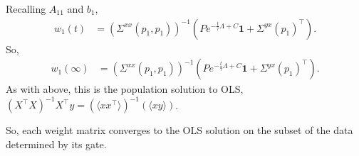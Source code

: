 \documentclass{article}
\begin{document}
Recalling $A_{11}$ and $b_1$,
\begin{align}
  w_1(t) &= ( \Sigma^{xx}(p_1,p_1) )^{-1} \left( P e^{ -\frac{t}{\tau} \Lambda + C } \mathbf{1} + \Sigma^{yx}(p_1)^\top \right).
\end{align}
So,
\begin{align}
  w_1(\infty) &= ( \Sigma^{xx}(p_1,p_1) )^{-1} \left( P e^{ -\frac{t}{\tau} \Lambda + C } \mathbf{1} + \Sigma^{yx}(p_1)^\top \right).
\end{align}
As with above, this is the population solution to OLS, $(X^\top X)^{-1} X^\top y = ( \langle x x^\top \rangle )^{-1} ( \langle x y \rangle )$.

So, each weight matrix converges to the OLS solution on the subset of the data determined by its gate.

\end{document}
